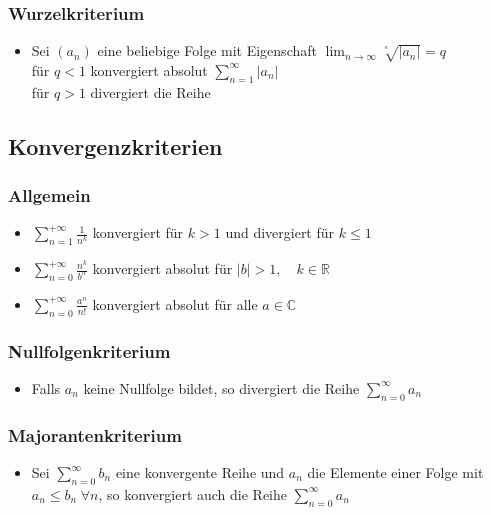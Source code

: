 \documentclass[a3paper, 11pt, landscape]{scrartcl}
\begin{document}
\begin{multicols*}{3}
		\subsubsection{Wurzelkriterium}
		\begin{itemize}
		    \item Sei $(a_n)$ eine beliebige Folge mit Eigenschaft $\lim_{n\to\infty} \sqrt[^n]{|a_n|} = q$\\
		    für $q<1$ konvergiert absolut $\sum_{n=1}^\infty |a_n|$\\
		    für $q>1$ divergiert die Reihe
		\end{itemize}
		
		\subsection{Konvergenzkriterien}
		\subsubsection{Allgemein}
		\begin{itemize}
		    \item $\sum_{n=1}^{+\infty} \frac{1}{n^{k}}$ konvergiert für $k > 1$ und divergiert für $k \leq 1$
		    \item $\sum_{n=0}^{+\infty} \frac{n^{k}}{b^{n}}$ konvergiert absolut für $|b|>1, \quad k \in \mathbb{R}$
		    \item $\sum_{n=0}^{+\infty} \frac{a^{n}}{n !}$ konvergiert absolut für alle $a \in \mathbb{C}$
		\end{itemize}
		\subsubsection{Nullfolgenkriterium}
		\begin{itemize}
		    \item Falls $a_n$ keine Nullfolge bildet, so divergiert die Reihe $\sum_{n=0}^{\infty}a_n$
		\end{itemize}
		
		\subsubsection{Majorantenkriterium}
		\begin{itemize}
		    \item Sei $\sum_{n=0}^{\infty}b_n$ eine konvergente Reihe und $a_n$ die Elemente einer Folge mit $a_n \le b_n \hspace{3pt} \forall n$, so konvergiert auch die Reihe $\sum_{n=0}^{\infty} a_n$
		\end{itemize}
		

\end{multicols*}
\end{document}
